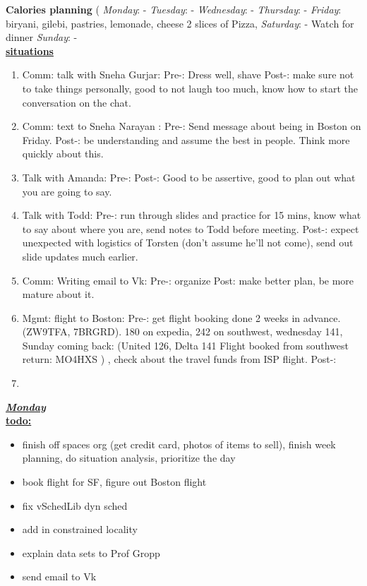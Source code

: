 \textbf{Calories planning}
{\small (
\textit{Monday}: -
\textit{Tuesday}: -
\textit{Wednesday}: -
\textit{Thursday}: -
\textit{Friday}: biryani, gilebi, pastries, lemonade, cheese 2 slices of Pizza,
\textit{Saturday}: -  Watch for dinner
\textit{Sunday}: -
 }\\

\underline{\textbf{situations}}\\
\begin{enumerate}

\item \small Comm: talk with Sneha Gurjar: Pre-: Dress well, shave
Post-:  make sure not to take things personally, good to not laugh too much,
know how to start the conversation on the chat. 

\item \small Comm: text to Sneha Narayan : Pre-: Send message
about being in Boston on Friday. Post-: be understanding
and assume the best in people. Think more quickly about this.

\item \small Talk with Amanda:  Pre-: Post-: Good to be assertive,
good to plan out what you are going to say.
\item \small Talk with Todd:  Pre-: run through slides and practice
for 15 mins, know what to say about where you are, send notes to Todd
before meeting. Post-: expect unexpected with logistics of Torsten
(don't assume he'll not come), send out slide updates much earlier.

\item \small Comm: Writing email to Vk: Pre-:  organize Post: make
better plan, be more mature about it.

\item \small Mgmt: flight to Boston:  Pre-: get flight booking done 2
weeks in advance. (ZW9TFA, 7BRGRD). 180 on expedia, 242 on southwest,
wednesday 141, Sunday coming back: (United 126, Delta 141
Flight booked from southwest return:  MO4HXS )  , check about the
travel funds from ISP flight.  Post-:

\item \small

\end{enumerate}
\newpage

\underline{\textbf{\textit{Monday}}}\\
\underline{\textbf{todo:}}
\begin{itemize}

\item  finish off spaces org (get credit card, photos of items to
sell), finish week planning,  do situation analysis, prioritize the
day
\item book flight for SF, figure out Boston flight  

\item fix vSchedLib dyn sched  
\item add in constrained locality
\item explain data sets to Prof Gropp

\item send email to Vk 

\end{itemize}

